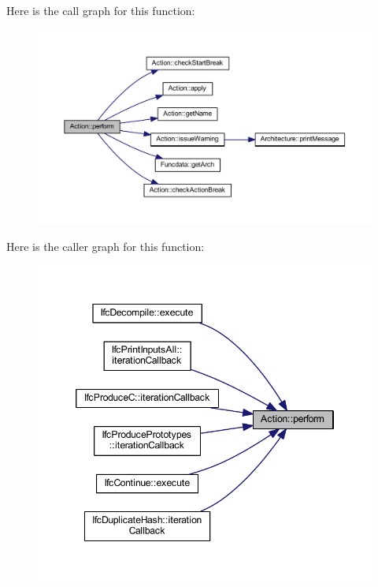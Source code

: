 Here is the call graph for this function\+:
\nopagebreak
\begin{figure}[H]
\begin{center}
\leavevmode
\includegraphics[width=350pt]{class_action_a44042367ad3fd93c6dba73a41a047c5c_cgraph}
\end{center}
\end{figure}
Here is the caller graph for this function\+:
\nopagebreak
\begin{figure}[H]
\begin{center}
\leavevmode
\includegraphics[width=346pt]{class_action_a44042367ad3fd93c6dba73a41a047c5c_icgraph}
\end{center}
\end{figure}
\mbox{\label{class_action_a0f7c833f74d267d7fbc50fa9e0f2a964}} 
